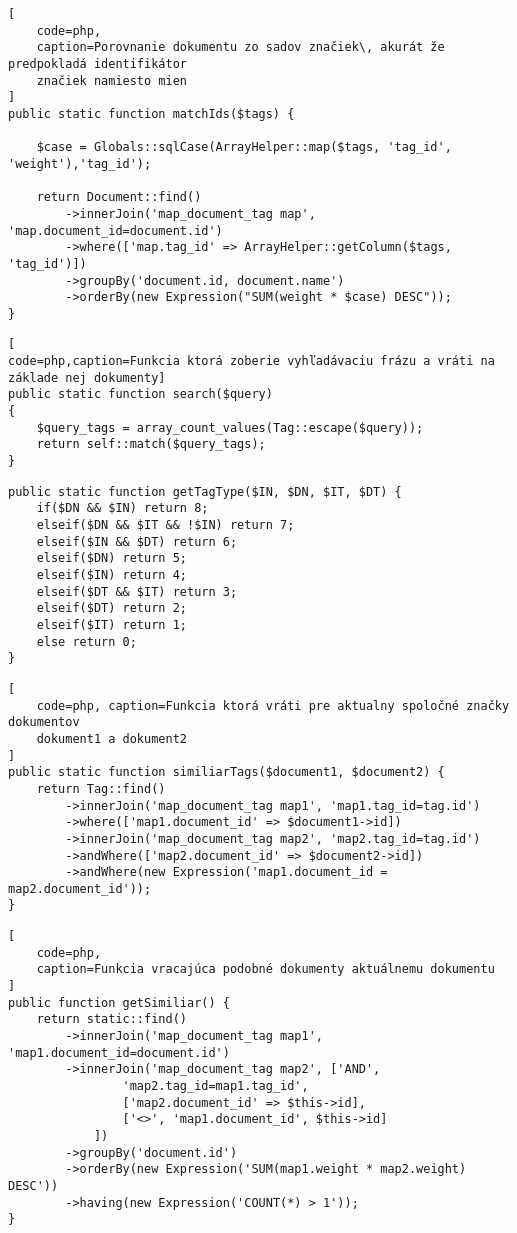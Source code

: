 \begin{lstlisting}[
    code=php,
    caption=Porovnanie dokumentu zo sadov značiek\, akurát že predpokladá identifikátor
    značiek namiesto mien
]
public static function matchIds($tags) {

    $case = Globals::sqlCase(ArrayHelper::map($tags, 'tag_id', 'weight'),'tag_id');

    return Document::find()
        ->innerJoin('map_document_tag map', 'map.document_id=document.id')
        ->where(['map.tag_id' => ArrayHelper::getColumn($tags, 'tag_id')])
        ->groupBy('document.id, document.name')
        ->orderBy(new Expression("SUM(weight * $case) DESC"));
}
\end{lstlisting}

\begin{lstlisting}[
code=php,caption=Funkcia ktorá zoberie vyhľadávaciu frázu a vráti na základe nej dokumenty]
public static function search($query)
{
    $query_tags = array_count_values(Tag::escape($query));
    return self::match($query_tags);
}
\end{lstlisting}

\begin{lstlisting}[code=php,caption=Funkcia ktorá vyhodnocuje typ značky na základe príznakov
DN - značka je názov dokumentu\, IN - značka je interpret dokumentu\, DT - značka sa nachádza
v názve dokumentu\, IT - značka sa nachádza v názve interpreta.]
public static function getTagType($IN, $DN, $IT, $DT) {
    if($DN && $IN) return 8;
    elseif($DN && $IT && !$IN) return 7;
    elseif($IN && $DT) return 6;
    elseif($DN) return 5;
    elseif($IN) return 4;
    elseif($DT && $IT) return 3;
    elseif($DT) return 2;
    elseif($IT) return 1;
    else return 0;
}
\end{lstlisting}

\begin{lstlisting}[
    code=php, caption=Funkcia ktorá vráti pre aktualny spoločné značky dokumentov
    dokument1 a dokument2
]
public static function similiarTags($document1, $document2) {
    return Tag::find()
        ->innerJoin('map_document_tag map1', 'map1.tag_id=tag.id')
        ->where(['map1.document_id' => $document1->id])
        ->innerJoin('map_document_tag map2', 'map2.tag_id=tag.id')
        ->andWhere(['map2.document_id' => $document2->id])
        ->andWhere(new Expression('map1.document_id = map2.document_id'));
}
\end{lstlisting}

\begin{lstlisting}[
    code=php,
    caption=Funkcia vracajúca podobné dokumenty aktuálnemu dokumentu
]
public function getSimiliar() {
    return static::find()
        ->innerJoin('map_document_tag map1', 'map1.document_id=document.id')
        ->innerJoin('map_document_tag map2', ['AND',
                'map2.tag_id=map1.tag_id',
                ['map2.document_id' => $this->id],
                ['<>', 'map1.document_id', $this->id]
            ])
        ->groupBy('document.id')
        ->orderBy(new Expression('SUM(map1.weight * map2.weight) DESC'))
        ->having(new Expression('COUNT(*) > 1'));
}
\end{lstlisting}

